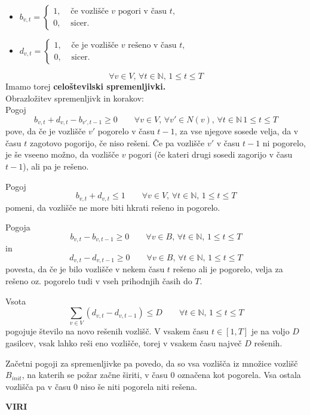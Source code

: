 \documentclass[a4paper, 11pt]{article}
\begin{document}
\begin{itemize} 
    \item $b_{v,t} = \begin{cases}
    1, & \text{ če  vozlišče $v$ pogori v času $t$} ,\\
    0, & \text{ sicer.}
    \end{cases} $

    \item $d_{v,t} = \begin{cases}
        1, & \text{ če je vozlišče $v$ rešeno v času $t$} ,\\
        0, & \text{ sicer.}
        \end{cases} $
\end{itemize}
$$\forall v \in V ,\, \forall t \in \mathbb{N} ,\, 1 \le t \le T$$
Imamo torej \textbf{celoštevilski spremenljivki.} \\

Obrazložitev spremenljivk in korakov: \\

Pogoj $$b_{v,t} + d_{v,t} - b_{v',t-1} \ge 0 \qquad \forall v \in V ,\, \forall v' \in N(v) ,\, \forall t \in \mathbb{N} \, 1 \le t \le T $$
pove, da če je vozlišče $v'$ pogorelo v času $t-1$, za vse njegove sosede velja, da v času $t$  zagotovo pogorijo, če 
niso rešeni. Če pa vozlišče $v'$ v času $t-1$ ni pogorelo, je še vseeno možno, da 
vozlišče $v$ pogori (če kateri drugi sosedi zagorijo v času $t-1$), ali pa je rešeno.

Pogoj $$b_{v,t} + d_{v,t} \le 1 \qquad \forall v \in V ,\, \forall t \in \mathbb{N} ,\, 1 \le t \le T$$
pomeni, da vozlišče ne more biti hkrati rešeno in pogorelo.

Pogoja $$b_{v,t} - b_{v,t-1} \ge 0 \qquad \forall v \in B ,\, \forall t \in \mathbb{N} ,\, 1 \le t \le T$$ in 
$$d_{v,t} - d_{v,t-1} \ge 0 \qquad \forall v \in B ,\, \forall t \in \mathbb{N} ,\, 1 \le t \le T$$
povesta, da če je bilo vozlišče v nekem času $t$ rešeno ali je pogorelo, velja za rešeno oz. pogorelo tudi v vseh prihodnjih časih do $T$.

Vsota $$\sum_{v \in V}{\left( d_{v,t} - d_{v, t-1} \right)} \le D \qquad \forall t \in \mathbb{N} ,\, 1 \le t \le T$$
pogojuje število na novo rešenih vozlišč. V vsakem času $t \in  [1, T]$ je na voljo $D$ gasilcev, vsak lahko reši
eno vozlišče, torej v vsakem času največ $D$ rešenih.

Začetni pogoji za spremenljivke pa povedo, da so vsa vozlišča iz množice vozlišč $B_{init}$, na 
katerih se požar začne širiti, v času $0$ označena kot pogorela. 
Vsa ostala vozlišča pa v času $0$ niso še niti pogorela niti rešena.








    













\noindent \textbf{VIRI} \\




\printindex
\end{document}
